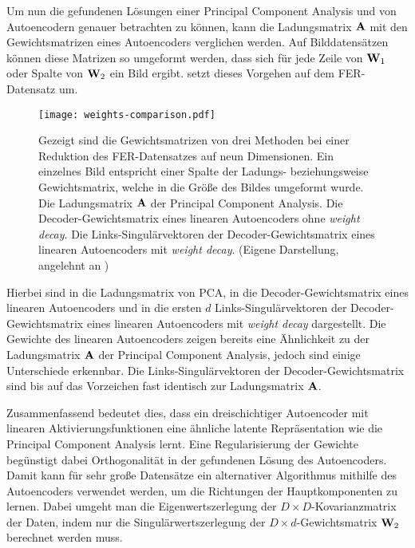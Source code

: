 Um nun die gefundenen Lösungen einer Principal Component Analysis und von Autoencodern genauer
betrachten zu können, kann die Ladungsmatrix $\mathbf{A}$ mit den Gewichtsmatrizen eines Autoencoders
verglichen werden. Auf Bilddatensätzen können diese Matrizen so umgeformt werden, dass sich für
jede Zeile von $\mathbf{W}_1$ oder Spalte von $\mathbf{W}_2$ ein Bild ergibt.
 setzt dieses Vorgehen auf dem FER-Datensatz um.
\begin{figure}[ht]
	\centering
	\texttt{[image: weights-comparison.pdf]}
	\caption[Die Gewichtsmatrizen von drei Methoden auf dem FER-Datensatz]{Gezeigt sind die Gewichtsmatrizen von drei Methoden bei einer Reduktion des FER-Datensatzes auf neun Dimensionen. Ein einzelnes Bild entspricht einer Spalte der Ladungs- beziehungsweise Gewichtsmatrix, welche in die Größe des Bildes umgeformt wurde. \captiona Die Ladungsmatrix $\mathbf{A}$ der Principal Component Analysis. \captionb Die Decoder-Gewichtsmatrix eines linearen Autoencoders ohne \textit{weight decay}. \captionc Die Links-Singulärvektoren der Decoder-Gewichtsmatrix eines linearen Autoencoders \captionb mit \textit{weight decay}. (Eigene Darstellung, angelehnt an \textcite[5]{Plaut.2018})}
	\label{fig:Gewichtsvergleich}
\end{figure}
Hierbei sind in  \captiona die Ladungsmatrix von PCA, in \captionb die Decoder-Gewichtsmatrix eines linearen Autoencoders und in \captionc die ersten $d$ Links-Singulärvektoren der Decoder-Gewichtsmatrix eines linearen Autoencoders mit \textit{weight decay} dargestellt.
Die Gewichte des linearen Autoencoders zeigen bereits eine Ähnlichkeit zu der Ladungsmatrix $\mathbf{A}$ der Principal Component Analysis, jedoch sind einige Unterschiede erkennbar. Die Links-Singulärvektoren der Decoder-Gewichtsmatrix sind bis auf das Vorzeichen fast identisch zur Ladungsmatrix $\mathbf{A}$.

Zusammenfassend bedeutet dies, dass ein dreischichtiger Autoencoder mit linearen
Aktivierungsfunktionen eine ähnliche latente Repräsentation wie die Principal Component Analysis
lernt. Eine Regularisierung der Gewichte begünstigt dabei Orthogonalität in der gefundenen Lösung
des Autoencoders. Damit kann für sehr große Datensätze ein alternativer Algorithmus mithilfe des
Autoencoders verwendet werden, um die Richtungen der Hauptkomponenten zu lernen. Dabei umgeht man
die Eigenwertszerlegung der $D \times D$-Kovarianzmatrix der Daten, indem nur die
Singulärwertszerlegung der $D \times d$-Gewichtsmatrix $\mathbf{W}_2$ berechnet werden muss.

